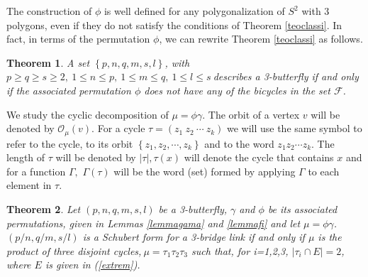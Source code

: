 \documentclass[12pt]{article}%
\newtheorem{theorem}{Theorem}
\begin{document}
The construction of $\phi$ is well defined for any polygonalization of $S^{2}$
with $3$ polygons, even if they do not satisfy the conditions of Theorem
\ref{teoclassi}. In fact, in terms of the permutation $\phi$, we can rewrite
Theorem \ref{teoclassi} as follows.

\begin{theorem}
A set $\left\{  p,n,q,m,s,l\right\}  $, with $p\geq q\geq s\geq2,\ 1\leq n\leq
p,\ 1\leq m\leq q,\ 1\leq l\leq s\ $describes a 3-butterfly if and only if the
associated permutation $\phi$ does not have any of the bicycles in the set
$\mathcal{F}$.
\end{theorem}

We study the cyclic decomposition of $\mu=\phi\gamma$. The orbit of a vertex
$v$ will be denoted by $\mathcal{O}_{\mu}\left(  v\right)  $. For a cycle
$\tau=\left(  z_{1}\ z_{2}\ \cdots\ z_{k}\right)  $ we will use the same
symbol to refer to the cycle, to its orbit $\left\{  z_{1},z_{2},\cdots
,z_{k}\right\}  $ and to the word $z_{1}z_{2}\cdots z_{k}$. The length of
$\tau$ will be denoted by $|\tau|,\tau\left(  x\right)  $ will denote the
cycle that contains $x$ and for a function $\Gamma,$ $\Gamma\left(
\tau\right)  $ will be the word (set) formed by applying $\Gamma$ to each
element in $\tau$.

\begin{theorem}
\label{teored}Let $\left(  p,n,q,m,s,l\right)  $ be a 3-butterfly, $\gamma$
and $\phi$ be its associated permutations, given in Lemmas  \ref{lemmagama}
and \ref{lemmafi} and let $\mu=\phi\gamma$. $\left(  p/n,q/m,s/l\right)  $ is
a Schubert form for a 3-bridge link if and only if $\mu$ is the product of
three disjoint cycles,$\ \mu=\tau_{1}\tau_{2}\tau_{3}$ such that, for
\thinspace i=1,2,3, $|\tau_{i}\cap E|=2$, where $E$ is given in (\ref{extrem}).
\end{theorem}
\end{document}
